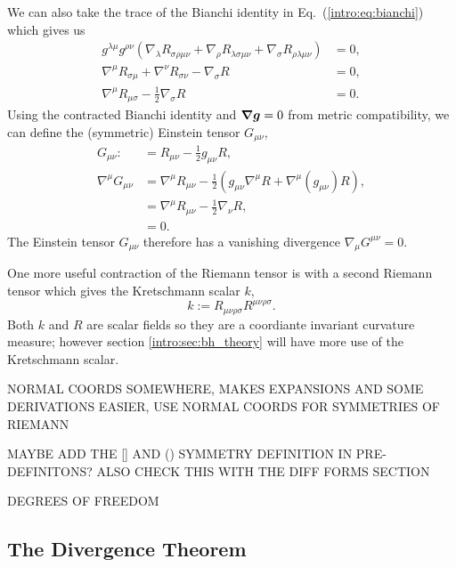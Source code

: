 We can also take the trace of the Bianchi identity in Eq.~(\ref{intro:eq:bianchi}) which gives us 
\begin{align}
g^{\lambda\mu}g^{\rho\nu} (\nabla_\lambda R_{\sigma\rho\mu\nu} + \nabla_\rho R_{\lambda\sigma\mu\nu} + \nabla_\sigma R_{\rho\lambda\mu\nu}) &= 0 , \\
 \nabla^\mu R_{\sigma\mu} + \nabla^\nu R_{\sigma\nu} - \nabla_\sigma R &= 0 , \\
 \nabla^\mu R_{\mu\sigma} - \frac{1}{2}\nabla_\sigma R&=0.
\end{align}
Using the contracted Bianchi identity and $\boldsymbol{\nabla}\boldsymbol{g}=0$ from metric compatibility, we can define the (symmetric) Einstein tensor $G_{\mu\nu}$,
\begin{align}
G_{\mu\nu} :&= R_{\mu\nu} - \frac{1}{2}g_{\mu\nu}R, \\
\nabla^\mu G_{\mu\nu} &= \nabla^\mu R_{\mu\nu} - \frac{1}{2}\left(g_{\mu\nu}\nabla^\mu R + \nabla^\mu (g_{\mu\nu})R\right) ,\\
&= \nabla^\mu R_{\mu\nu} - \frac{1}{2}\nabla_\nu R  ,\label{intro:eq:einstein_tensor_div}\\
&=0.
\end{align}
The Einstein tensor $G_{\mu\nu}$ therefore has a vanishing divergence $\nabla_\mu G^{\mu\nu}=0$.

One more useful contraction of the Riemann tensor is with a second Riemann tensor which gives the Kretschmann scalar $k$,
\begin{equation} \label{intro:eq:kretschdef}
k := R_{\mu\nu\rho\sigma}R^{\mu\nu\rho\sigma}.
\end{equation}
Both $k$ and $R$ are scalar fields so they are a coordiante invariant curvature measure; however section \ref{intro:sec:bh_theory} will have more use of the Kretschmann scalar.




NORMAL COORDS SOMEWHERE, MAKES EXPANSIONS AND SOME DERIVATIONS EASIER, USE NORMAL COORDS FOR SYMMETRIES OF RIEMANN

MAYBE ADD THE [] AND () SYMMETRY DEFINITION IN PRE-DEFINITONS? ALSO CHECK THIS WITH THE DIFF FORMS SECTION

DEGREES OF FREEDOM


 



\subsection{The Divergence Theorem}\label{intro:sec:div}

